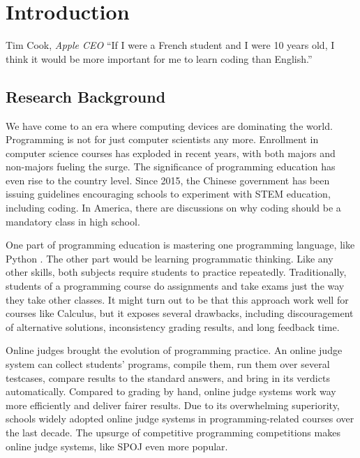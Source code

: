 
\chapter{Introduction}
\label{chap:intro}

\begin{chapquote}{Tim Cook, \textit{Apple CEO}}
    ``If I were a French student and I were 10 years old,
    I think it would be more important for me to learn coding than English.''
\end{chapquote}

\section{Research Background}

    We have come to an era where computing devices are dominating the world.
    Programming is not for just computer scientists any more.
    Enrollment in computer science courses has exploded in recent years,
    with both majors and non-majors fueling the surge.
    The significance of programming education has even rise to the country level.
    Since 2015, the Chinese government has been issuing guidelines encouraging schools
    to experiment with STEM education, including coding. 
    In America, there are discussions on why coding should be a mandatory class in high school.
    \cite{tim_bajrin_why_2014}

    One part of programming education is mastering one programming language, like Python .
    The other part would be learning programmatic thinking.
    Like any other skills, both subjects require students to practice repeatedly.
    Traditionally, students of a programming course do assignments and take exams
    just the way they take other classes.
    It might turn out to be that this approach work well for courses like Calculus,
    but it exposes several drawbacks, including discouragement of alternative solutions,
    inconsistency grading results, and long feedback time.

    Online judges brought the evolution of programming practice.
    An online judge system can collect students' programs, compile them,
    run them over several testcases, compare results to the standard answers,
    and bring in its verdicts automatically.
    Compared to grading by hand, online judge systems work way more efficiently and deliver fairer results.
    Due to its overwhelming superiority,
    schools widely adopted online judge systems in programming-related courses over the last decade.
    \cite{Li2005,luo2008programming}
    The upsurge of competitive programming competitions makes online judge systems,
    like SPOJ \cite{kosowski2007application} even more popular.

